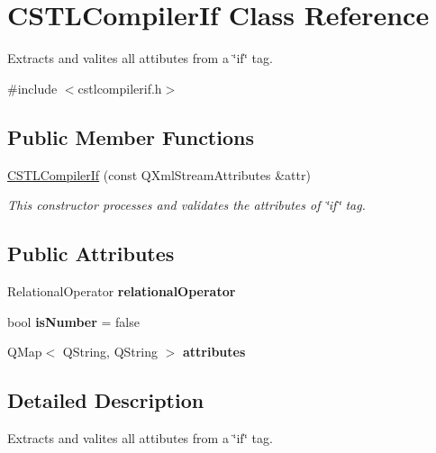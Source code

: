 \hypertarget{class_c_s_t_l_compiler_if}{}\section{C\+S\+T\+L\+Compiler\+If Class Reference}
\label{class_c_s_t_l_compiler_if}


Extracts and valites all attibutes from a \char`\"{}if\char`\"{} tag.  




{\ttfamily \#include $<$cstlcompilerif.\+h$>$}

\subsection*{Public Member Functions}
\begin{DoxyCompactItemize}
\item 
\mbox{\hyperlink{class_c_s_t_l_compiler_if_a6d9ff3428d392123f5139d8ca65e5322}{C\+S\+T\+L\+Compiler\+If}} (const Q\+Xml\+Stream\+Attributes \&attr)
\begin{DoxyCompactList}\small\item\em This constructor processes and validates the attributes of \char`\"{}if\char`\"{} tag. \end{DoxyCompactList}\end{DoxyCompactItemize}
\subsection*{Public Attributes}
\begin{DoxyCompactItemize}
\item 
\mbox{\label{class_c_s_t_l_compiler_if_a62b146cf929d1281be7a4d280bff04df}} 
Relational\+Operator {\bfseries relational\+Operator}
\item 
\mbox{\label{class_c_s_t_l_compiler_if_a598f5f0e824ffa6a6b817a362e108363}} 
bool {\bfseries is\+Number} = false
\item 
\mbox{\label{class_c_s_t_l_compiler_if_a6bf7af6ef1a5c9c5f0654b6873ffe6d0}} 
Q\+Map$<$ Q\+String, Q\+String $>$ {\bfseries attributes}
\end{DoxyCompactItemize}


\subsection{Detailed Description}
Extracts and valites all attibutes from a \char`\"{}if\char`\"{} tag. 

